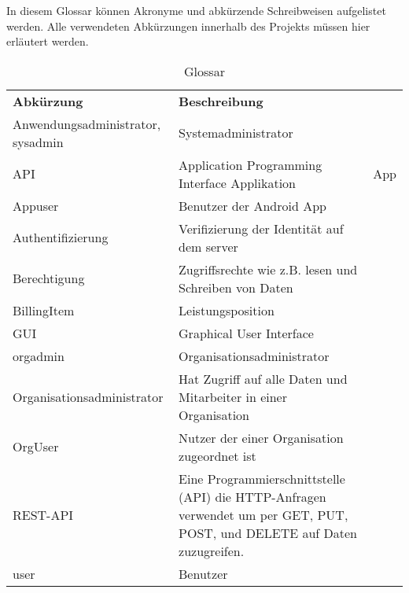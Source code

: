 \begin{tcolorbox}
	In diesem Glossar können Akronyme und abkürzende Schreibweisen aufgelistet werden. 
	Alle verwendeten Abkürzungen innerhalb des Projekts müssen hier erläutert werden.
\end{tcolorbox}

\begin{table}[h]
	\centering
	\begin{tabularx}{\textwidth}{X X}
		\rowcolor[HTML]{C0C0C0} 
		\textbf{Abkürzung} & \textbf{Beschreibung} \\
		Anwendungsadministrator, sysadmin & Systemadministrator \\

		\rowcolor[HTML]{E7E7E7} 
		API & Application Programming Interface
		Applikation & App \\

		Appuser & Benutzer der Android App \\
		
		Authentifizierung & Verifizierung der Identität auf dem server \\
		
		Berechtigung & Zugriffsrechte wie z.B. lesen und Schreiben von Daten \\
		BillingItem & Leistungsposition \\
		GUI & Graphical User Interface \\

		orgadmin & Organisationsadministrator \\
		Organisationsadministrator & Hat Zugriff auf alle Daten und Mitarbeiter in einer Organisation \\
		OrgUser & Nutzer der einer Organisation zugeordnet ist \\
		
		REST-API & Eine Programmierschnittstelle (API) die HTTP-Anfragen verwendet um per GET, PUT, POST, und DELETE auf Daten zuzugreifen.\\
		user & Benutzer \\
	\end{tabularx}
	\caption{Glossar}
	\label{table:glossar}
\end{table}
